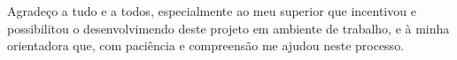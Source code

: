 \begin{agradecimentos}[AGRADECIMENTOS]

Agradeço a tudo e a todos, especialmente ao meu superior que incentivou e possibilitou o desenvolvimendo deste projeto em ambiente de trabalho, e à minha orientadora que, com paciência e compreensão me ajudou neste processo.

\end{agradecimentos}

